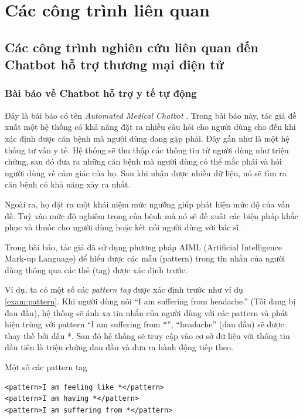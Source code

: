 \chapter{Các công trình liên quan}

\section{Các công trình nghiên cứu liên quan đến Chatbot hỗ trợ
thương mại điện tử}

\subsection{Bài báo về Chatbot hỗ trợ y tế tự động}
Đây là bài báo có tên \textit{Automated Medical Chatbot}
\cite{automatedmedical}. Trong bài báo này, tác giả đề xuất một
hệ thống có khả năng đặt ra nhiều câu hỏi cho người dùng cho đến khi
xác định được căn bệnh mà người dùng đang gặp phải. Đây gần như là
một hệ thống tư vấn y tế. Hệ thống sẽ thu thập các thông tin từ
người dùng như triệu chứng, sau đó đưa ra những căn bệnh mà
người dùng có thể mắc phải và hỏi người dùng về cảm giác của họ.
Sau khi nhận được nhiều dữ liệu, nó sẽ tìm ra căn bệnh
có khả năng xảy ra nhất.

Ngoài ra, họ đặt ra một khái niệm mức ngưỡng giúp phát hiện mức độ
của vấn đề. Tuỳ vào mức độ nghiêm trọng của bệnh mà nó sẽ đề xuất
các biện pháp khắc phục và thuốc cho người dùng hoặc kết nối
người dùng với bác sĩ.

Trong bài báo, tác giả đã sử dụng phương pháp AIML (Artificial
Intelligence Mark-up Lang\-uage) để hiểu được các mẫu (pattern)
trong tin nhắn của người dùng thông qua các thẻ (tag)
được xác định trước.

Ví dụ, ta có một số các \textit{pattern tag} được xác định
trước như ví dụ \ref{exam:pattern}. Khi người dùng nói
\enquote{I am suffering from headache.} (Tôi đang bị đau đầu),
hệ thống sẽ ánh xạ tin nhắn của người dùng với các pattern
và phát hiện trùng với pattern \enquote{I am suffering from *},
\enquote{headache}
(đau đầu) sẽ được thay thế bởi dấu *. Sau đó hệ thống sẽ truy cập
vào cơ sở dữ liệu với thông tin đầu tiên là triệu chứng đau đầu
và đưa ra hành động tiếp theo.

\renewcommand{\textboxenvname}{Ví dụ}
\begin{textbox}{Một số các pattern tag}
\begin{Verbatim}[breaklines=true, breakanywhere=true]
<pattern>I am feeling like *</pattern>
<pattern>I am having *</pattern>
<pattern>I am suffering from *</pattern>
\end{Verbatim}
\end{textbox}

